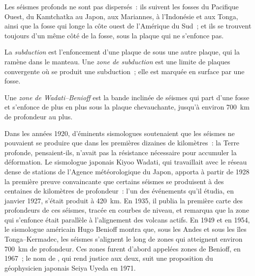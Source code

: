 Les séismes profonds ne sont pas dispersés~: ils suivent les fosses du
Pacifique Ouest, du Kamtchatka au Japon, aux Mariannes, à l'Indonésie et aux
Tonga, ainsi que la fosse qui longe la côte ouest de l'Amérique du Sud~; et
ils se trouvent toujours d'un même côté de la fosse, sous la plaque qui ne
s'enfonce pas.

\begin{definition}\label{def:g11:subduction-zones:subduction}
La \emph{subduction} est l'enfoncement d'une plaque de
 sous une autre plaque, qui la ramène dans le manteau.
Une \emph{zone de subduction} est une limite de
plaques convergente où se produit une subduction~; elle est marquée en
surface par une fosse.
\end{definition}

\begin{definition}\label{def:g11:subduction-zones:benioff}
Une \emph{zone de Wadati--Benioff} est la
bande inclinée de séismes qui part d'une fosse et s'enfonce de plus en plus
sous la plaque chevauchante, jusqu'à environ \qty{700}{km} de profondeur au
plus.
\end{definition}

\begin{history}
Dans les années 1920, d'éminents sismologues soutenaient que les séismes ne
pouvaient se produire que dans les premières dizaines de kilomètres~: la
Terre profonde, pensaient-ils, n'avait pas la résistance nécessaire pour
accumuler la déformation. Le sismologue japonais Kiyoo Wadati, qui
travaillait avec le réseau dense de stations de l'Agence météorologique du
Japon, apporta à partir de 1928 la première preuve convaincante que certains
séismes se produisent à des centaines de kilomètres de profondeur~: l'un des
événements qu'il étudia, en janvier 1927, s'était produit à \qty{420}{km}.
En 1935, il publia la première carte des profondeurs de ces séismes,
tracée en courbes de niveau, et remarqua que la zone qui s'enfonce était
parallèle à l'alignement des volcans actifs. En 1949 et en 1954, le
sismologue américain Hugo Benioff montra que, sous les Andes et sous les
îles Tonga--Kermadec, les séismes s'alignent le long de zones qui atteignent
environ \qty{700}{km} de profondeur. Ces zones furent d'abord appelées zones
de Benioff, en 1967~; le nom de , qui rend justice
aux deux, suit une proposition du géophysicien japonais Seiya Uyeda en 1971.
\end{history}

